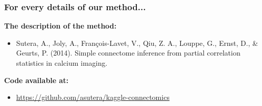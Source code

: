 \documentclass[final]{beamer}
\begin{document}
\begin{frame}
\frametitle{For every details of our method...}

\textbf{The description of the method:}
\begin{itemize}
\item[] Sutera, A., Joly, A., François-Lavet, V., Qiu, Z. A., Louppe, G., Ernst, D., \& Geurts, P. (2014). Simple connectome inference from partial correlation statistics in calcium imaging.\\[7ex]
\end{itemize} 

\textbf{Code available at:}
\begin{itemize}
\item[] \url{https://github.com/asutera/kaggle-connectomics}
\end{itemize}

\end{frame}
\end{document}
